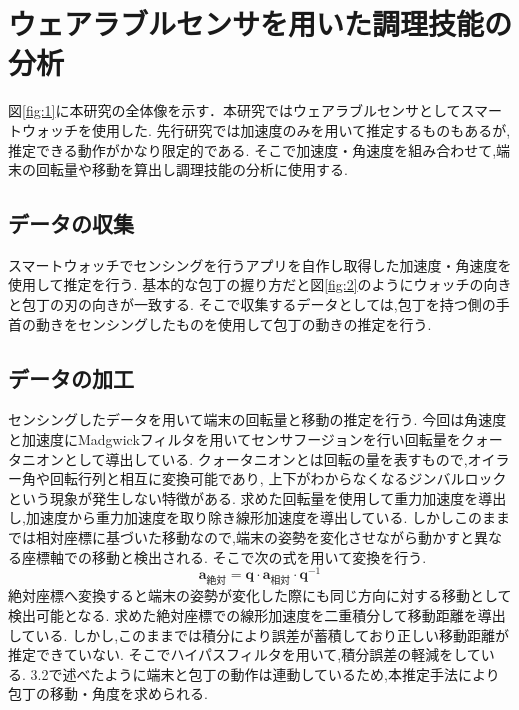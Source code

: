 \section{ウェアラブルセンサを用いた調理技能の分析}
図\ref{fig:1}に本研究の全体像を示す．本研究ではウェアラブルセンサとしてスマートウォッチを使用した.
先行研究\cite{kumazawaanalysis}では加速度のみを用いて推定するものもあるが,推定できる動作がかなり限定的である.
そこで加速度・角速度を組み合わせて,端末の回転量や移動を算出し調理技能の分析に使用する.


\subsection{データの収集}
スマートウォッチでセンシングを行うアプリを自作し取得した加速度・角速度を使用して推定を行う.
基本的な包丁の握り方だと図\ref{fig:2}のようにウォッチの向きと包丁の刃の向きが一致する.
そこで収集するデータとしては,包丁を持つ側の手首の動きをセンシングしたものを使用して包丁の動きの推定を行う.
\subsection{データの加工}
センシングしたデータを用いて端末の回転量と移動の推定を行う.
今回は角速度と加速度にMadgwickフィルタを用いてセンサフージョンを行い回転量をクォータニオンとして導出している.
クォータニオンとは回転の量を表すもので,オイラー角や回転行列と相互に変換可能であり,
上下がわからなくなるジンバルロックという現象が発生しない特徴がある.
求めた回転量を使用して重力加速度を導出し,加速度から重力加速度を取り除き線形加速度を導出している.
しかしこのままでは相対座標に基づいた移動なので,端末の姿勢を変化させながら動かすと異なる座標軸での移動と検出される.
そこで次の式を用いて変換を行う.
\[
\mathbf{a}_{\text{絶対}} = \mathbf{q} \cdot \mathbf{a}_{\text{相対}} \cdot \mathbf{q}^{-1}
\]
絶対座標へ変換すると端末の姿勢が変化した際にも同じ方向に対する移動として検出可能となる.
求めた絶対座標での線形加速度を二重積分して移動距離を導出している.
しかし,このままでは積分により誤差が蓄積しており正しい移動距離が推定できていない.
そこでハイパスフィルタを用いて,積分誤差の軽減をしている.
3.2で述べたように端末と包丁の動作は連動しているため,本推定手法により包丁の移動・角度を求められる.


